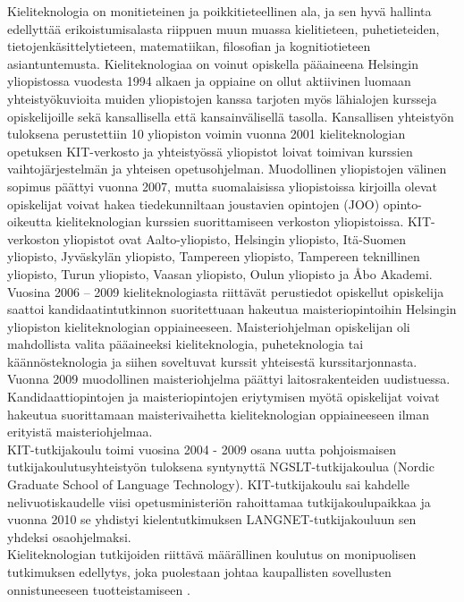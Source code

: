 \begin{multicols}{2}
Kieliteknologia on monitieteinen ja poikkitieteellinen ala, ja sen
hyvä hallinta edellyttää erikoistumisalasta riippuen muun muassa
kielitieteen, puhetieteiden, tietojenkäsittelytieteen, matematiikan,
filosofian ja kognitiotieteen asiantuntemusta. Kieliteknologiaa on
voinut opiskella pääaineena Helsingin yliopistossa vuodesta 1994
alkaen ja oppiaine on ollut aktiivinen luomaan yhteistyökuvioita
muiden yliopistojen kanssa tarjoten myös lähialojen kursseja
opiskelijoille sekä kansallisella että kansainvälisellä
tasolla. Kansallisen yhteistyön tuloksena perustettiin 10 yliopiston
voimin vuonna 2001 kieliteknologian opetuksen KIT-verkosto ja
yhteistyössä yliopistot loivat toimivan kurssien vaihtojärjestelmän ja
yhteisen opetusohjelman.  Muodollinen yliopistojen välinen sopimus
päättyi vuonna 2007, mutta suomalaisissa yliopistoissa kirjoilla
olevat opiskelijat voivat hakea tiedekunniltaan joustavien opintojen
(JOO) opinto-oikeutta kieliteknologian kurssien suorittamiseen
verkoston yliopistoissa. KIT-verkoston yliopistot ovat
Aalto-yliopisto, Helsingin yliopisto, Itä-Suomen yliopisto, Jyväskylän yliopisto, 
Tampereen yliopisto, Tampereen teknillinen yliopisto, Turun yliopisto, Vaasan
yliopisto, Oulun yliopisto ja Åbo Akademi.\\
Vuosina 2006 – 2009 kieliteknologiasta riittävät perustiedot
opiskellut opiskelija saattoi kandidaatintutkinnon suoritettuaan
hakeutua maisteriopintoihin Helsingin yliopiston kieliteknologian
oppiaineeseen.  Maisteriohjelman opiskelijan oli mahdollista valita pääaineeksi
kieliteknologia, puheteknologia tai käännösteknologia ja siihen soveltuvat kurssit yhteisestä 
kurssitarjonnasta. Vuonna 2009 muodollinen maisteriohjelma
päättyi laitosrakenteiden uudistuessa.  Kandidaattiopintojen ja
maisteriopintojen eriytymisen myötä opiskelijat voivat hakeutua
suorittamaan maisterivaihetta kieliteknologian oppiaineeseen ilman
erityistä maisteriohjelmaa.\\
KIT-tutkijakoulu toimi vuosina 2004 - 2009 osana uutta pohjoismaisen
tutkijakoulutusyhteistyön tuloksena syntynyttä NGSLT-tutkijakoulua
(Nordic Graduate School of Language Technology). KIT-tutkijakoulu sai kahdelle
nelivuotiskaudelle viisi opetusministeriön rahoittamaa
tutkijakoulupaikkaa ja vuonna 2010 se yhdistyi kielentutkimuksen
LANGNET-tutkijakouluun sen yhdeksi osaohjelmaksi.\\
Kieliteknologian tutkijoiden riittävä määrällinen koulutus on
monipuolisen tutkimuksen edellytys, joka puolestaan johtaa
kaupallisten sovellusten onnistuneeseen tuotteistamiseen \cite{FinExp}.



\end{multicols}
